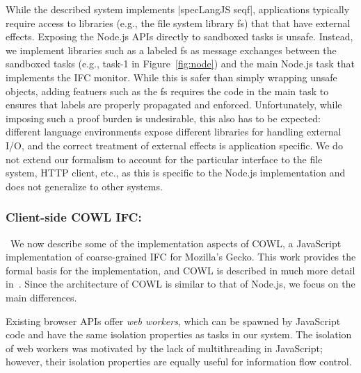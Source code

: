 While the described system implements |specLangJS seqf|, applications
typically require access to libraries (e.g., the file system library
\textsf{fs}) that that have external effects.
%
Exposing the Node.js APIs directly to sandboxed tasks is unsafe.
Instead, we implement libraries such as a labeled \textsf{fs} as
message exchanges between the sandboxed tasks (e.g., \textsf{task-1}
in Figure~\ref{fig:node}) and the main Node.js task that implements
the IFC monitor.
%
While this is safer than simply wrapping unsafe objects, adding
featuers such as the \textsf{fs} requires the code in the main task to
ensures that labels are properly propagated and enforced.
%
Unfortunately, while imposing such a proof burden
is undesirable, this also has to be expected:
different language environments expose different libraries for
handling external I/O, and the correct treatment of external effects
is application specific.
%
%
%
We do not extend our formalism to account for the  particular
interface to the file system, HTTP client, etc., as this is
specific to the Node.js implementation and does not generalize
to other systems.


\subsubsection{Client-side COWL IFC:}\
We now describe some of the implementation aspects of
COWL, a JavaScript implementation of coarse-grained
IFC for Mozilla's Gecko.  This work provides the formal basis for
the implementation, and COWL is described in much more detail in~\cite{swapi}.
%
Since the architecture of COWL is similar to that of Node.js, we focus
on the main differences.

%
Existing browser APIs offer \emph{web workers}, which can
be spawned by JavaScript code and have
the same isolation properties as tasks in our system.
%
The isolation of web workers was motivated by the lack of multithreading
in JavaScript; however, their isolation properties are equally useful for information
flow control.

